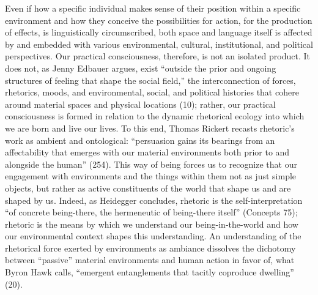 \documentclass{article}
\begin{document}
Even if how a specific individual makes sense of their position within a specific environment and how they conceive the possibilities for action, for the production of effects, is linguistically circumscribed, both space and language itself is affected by and embedded with various environmental, cultural, institutional, and political perspectives. Our practical consciousness, therefore, is not an isolated product. It does not, as Jenny Edbauer argues, exist ``outside the prior and ongoing structures of feeling that shape the social field,'' the interconnection of forces, rhetorics, moods, and environmental, social, and political histories that cohere around material spaces and physical locations (10); rather, our practical consciousness is formed in relation to the dynamic rhetorical ecology into which we are born and live our lives. To this end, Thomas Rickert recasts rhetoric's work as ambient and ontological: ``persuasion gains its bearings from an affectability that emerges with our material environments both prior to and alongside the human'' (254). This way of being forces us to recognize that our engagement with environments and the things within them not as just simple objects, but rather as active constituents of the world that shape us and are shaped by us. Indeed, as Heidegger concludes, rhetoric is the self-interpretation ``of concrete being-there, the hermeneutic of being-there itself'' (Concepts 75); rhetoric is the means by which we understand our being-in-the-world and how our environmental context shapes this understanding. An understanding of the rhetorical force exerted by environments as ambiance dissolves the dichotomy between ``passive'' material environments and human action in favor of, what Byron Hawk calls, ``emergent entanglements that tacitly coproduce dwelling'' (20).
\end{document}
